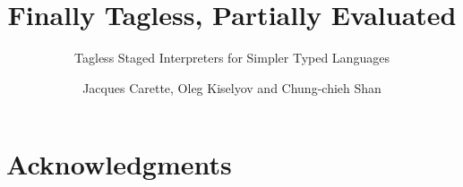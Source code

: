 \documentclass{jfp}
\begin{document}
\title{Finally Tagless, Partially Evaluated}
\subtitle{Tagless Staged Interpreters for Simpler Typed Languages}
\author{Jacques Carette, Oleg Kiselyov and Chung-chieh Shan}
\def\draftnote{}

\maketitle


\section*{Acknowledgments}
\ourthanks


\bibsep=0pt

\end{document}
